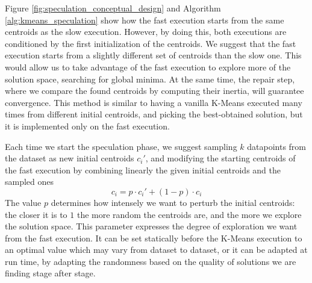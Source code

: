 Figure \ref{fig:speculation_conceptual_design} and Algorithm \ref{alg:kmeans_speculation} show how the fast execution starts from the same centroids as the slow execution. However, by doing this, both executions are conditioned by the first initialization of the centroids. We suggest that the fast execution starts from a slightly different set of centroids than the slow one. This would allow us to take advantage of the fast execution to explore more of the solution space, searching for global minima.  At the same time, the repair step, where we compare the found centroids by computing their inertia, will guarantee convergence. This method is similar to having a vanilla K-Means executed many times from different initial centroids, and picking the best-obtained solution, but it is implemented only on the fast execution.

Each time we start the speculation phase, we suggest sampling $k$ datapoints from the dataset as new initial centroids $c_i'$, and modifying the starting centroids of the fast execution by combining linearly the given initial centroids and the sampled ones
\begin{equation}
c_i = p \cdot c_i' + (1-p) \cdot c_i
\end{equation} The value $p$ determines how intensely we want to perturb the initial centroids: the closer it is to $1$ the more random the centroids are, and the more we explore the solution space. This parameter expresses the degree of exploration we want from the fast execution. It can be set statically before the K-Means execution to an optimal value which may vary from dataset to dataset, or it can be adapted at run time, by adapting the randomness based on the quality of solutions we are finding stage after stage.
